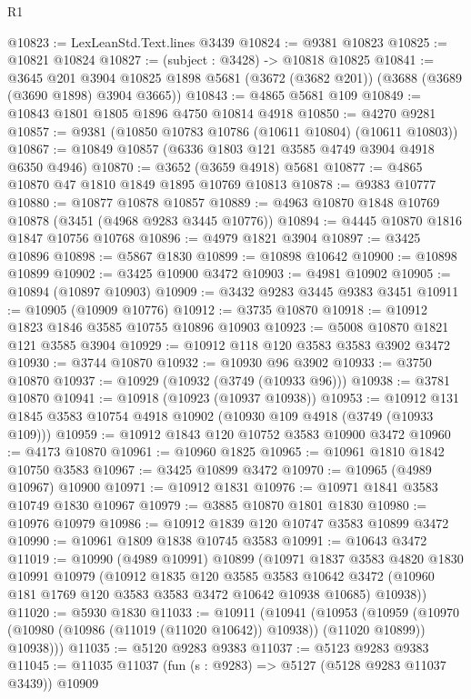 \begin{lexlean}{R1}
\begin{coremodule}
@10823 := LexLeanStd.Text.lines @3439
@10824 := @9381 @10823
@10825 := @10821 @10824
@10827 := (subject : @3428) -> @10818 @10825
@10841 := @3645
    @201
    @3904
    @10825
    @1898
    @5681
    (@3672 (@3682 @201))
    (@3688 (@3689 (@3690 @1898) @3904 @3665))
@10843 := @4865 @5681 @109
@10849 := @10843 @1801 @1805 @1896 @4750 @10814 @4918
@10850 := @4270 @9281
@10857 := @9381 (@10850 @10783 @10786 (@10611 @10804) (@10611 @10803))
@10867 := @10849 @10857 (@6336 @1803 @121 @3585 @4749 @3904 @4918 @6350 @4946)
@10870 := @3652 (@3659 @4918) @5681
@10877 := @4865 @10870 @47 @1810 @1849 @1895 @10769 @10813
@10878 := @9383 @10777
@10880 := @10877 @10878 @10857
@10889 := @4963 @10870 @1848 @10769 @10878 (@3451 (@4968 @9283 @3445 @10776))
@10894 := @4445 @10870 @1816 @1847 @10756 @10768
@10896 := @4979 @1821 @3904
@10897 := @3425 @10896
@10898 := @5867 @1830
@10899 := @10898 @10642
@10900 := @10898 @10899
@10902 := @3425 @10900 @3472
@10903 := @4981 @10902
@10905 := @10894 (@10897 @10903)
@10909 := @3432 @9283 @3445 @9383 @3451
@10911 := @10905 (@10909 @10776)
@10912 := @3735 @10870
@10918 := @10912 @1823 @1846 @3585 @10755 @10896 @10903
@10923 := @5008 @10870 @1821 @121 @3585 @3904
@10929 := @10912 @118 @120 @3583 @3583 @3902 @3472
@10930 := @3744 @10870
@10932 := @10930 @96 @3902
@10933 := @3750 @10870
@10937 := @10929 (@10932 (@3749 (@10933 @96)))
@10938 := @3781 @10870
@10941 := @10918 (@10923 (@10937 @10938))
@10953 := @10912 @131 @1845 @3583 @10754 @4918 @10902 (@10930 @109 @4918 (@3749 (@10933 @109)))
@10959 := @10912 @1843 @120 @10752 @3583 @10900 @3472
@10960 := @4173 @10870
@10961 := @10960 @1825
@10965 := @10961 @1810 @1842 @10750 @3583
@10967 := @3425 @10899 @3472
@10970 := @10965 (@4989 @10967) @10900
@10971 := @10912 @1831
@10976 := @10971 @1841 @3583 @10749 @1830 @10967
@10979 := @3885 @10870 @1801 @1830
@10980 := @10976 @10979
@10986 := @10912 @1839 @120 @10747 @3583 @10899 @3472
@10990 := @10961 @1809 @1838 @10745 @3583
@10991 := @10643 @3472
@11019 := @10990
    (@4989 @10991)
    @10899
    (@10971
      @1837
      @3583
      @4820
      @1830
      @10991
      @10979
      (@10912
        @1835
        @120
        @3585
        @3583
        @10642
        @3472
        (@10960 @181 @1769 @120 @3583 @3583 @3472 @10642 @10938 @10685)
        @10938))
@11020 := @5930 @1830
@11033 := @10911
    (@10941
      (@10953
        (@10959 (@10970 (@10980 (@10986 (@11019 (@11020 @10642)) @10938)) (@11020 @10899)) @10938)))
@11035 := @5120 @9283 @9383
@11037 := @5123 @9283 @9383
@11045 := @11035 @11037 (fun (s : @9283) => @5127 (@5128 @9283 @11037 @3439)) @10909

\end{coremodule}
\end{lexlean}
